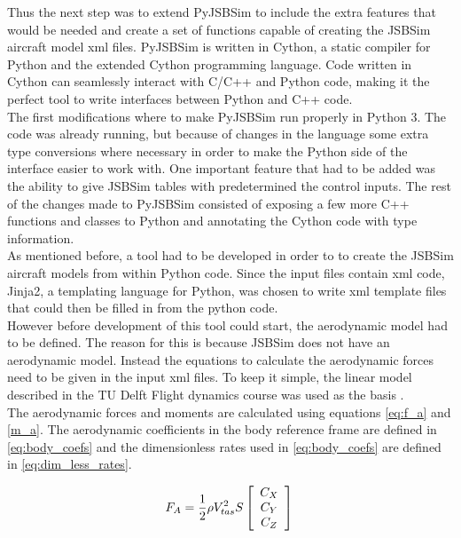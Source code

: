 Thus the next step was to extend PyJSBSim to include the extra features that would be needed and create a set of functions capable of creating the JSBSim aircraft model \gls{xml} files. PyJSBSim is written in Cython, a static compiler for Python and the extended Cython programming language. Code written in Cython can seamlessly interact with C/C++ and Python code, making it the perfect tool to write interfaces between Python and C++ code. \\

The first modifications where to make PyJSBSim run properly in Python 3. The code was already running, but because of changes in the language some extra type conversions where necessary in order to make the Python side of the interface easier to work with. One important feature that had to be added was the ability to give JSBSim tables with predetermined the control inputs. The rest of the changes made to PyJSBSim consisted of exposing a few more C++ functions and classes to Python and annotating the Cython code with type information.\\

As mentioned before, a tool had to be developed in order to to create the JSBSim aircraft models from within Python code. Since the input files contain \gls{xml} code, Jinja2, a templating language for Python, was chosen to write \gls{xml} template files that could then be filled in from the python code. \\

However before development of this tool could start, the aerodynamic model had to be defined. The reason for this is because JSBSim does not have an aerodynamic model. Instead the equations to calculate the aerodynamic forces need to be given in the input \gls{xml} files. To keep it simple, the linear model described in the TU Delft Flight dynamics course was used as the basis \cite{fdreader}. \\

The aerodynamic forces and moments are calculated using equations \ref{eq:f_a} and \ref{m_a}. The aerodynamic coefficients in the body reference frame are defined in \ref{eq:body_coefs} and the dimensionless rates used in \ref{eq:body_coefs} are defined in \ref{eq:dim_less_rates}.

\begin{equation}
\label{eq:f_a}
{F_A} = \frac{1}{2}\rho V_{tas}^2S\left[ {\begin{array}{*{20}{c}}
{{C_X}}\\
{{C_Y}}\\
{{C_Z}}
\end{array}} \right]\\
\end{equation}


